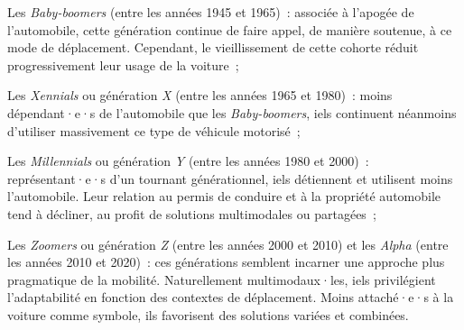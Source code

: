 \begin{refsegment}
{        \begin{customitemize}
    \item Les \textsl{Baby-boomers} (entre les années 1945 et 1965)~: associée à l'apogée de l'automobile, cette génération continue de faire appel, de manière soutenue, à ce mode de déplacement. Cependant, le vieillissement de cette cohorte réduit progressivement leur usage de la voiture~;
    \item Les \textsl{Xennials} ou génération \textsl{X} (entre les années 1965 et 1980)~: moins dépendant·e·s de l'automobile que les \textsl{Baby-boomers}, iels continuent néanmoins d'utiliser massivement ce type de véhicule motorisé~;
    \item Les \textsl{Millennials} ou génération \textsl{Y} (entre les années 1980 et 2000)~: représentant·e·s d'un tournant générationnel, iels détiennent et utilisent moins l'automobile. Leur relation au permis de conduire et à la propriété automobile tend à décliner, au profit de solutions multimodales ou partagées~;
    \item Les \textsl{Zoomers} ou génération \textsl{Z} (entre les années 2000 et 2010) et les \textsl{Alpha} (entre les années 2010 et 2020)~: ces générations semblent incarner une approche plus pragmatique de la mobilité. Naturellement multimodaux·les, iels privilégient l'adaptabilité en fonction des contextes de déplacement. Moins attaché·e·s à la voiture comme symbole, ils favorisent des solutions variées et combinées.
        \end{customitemize}
}
\end{refsegment}

